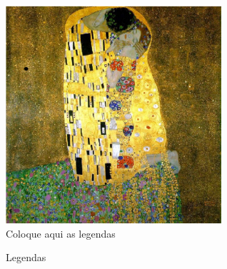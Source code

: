 \begin{figure}[hbtp]
\begin{center}
\includegraphics[width=8cm]{klint.pdf}
\caption{Coloque aqui as legendas}
\label{fig}
\end{center}
\end{figure}
\vspace{0.5cm}

\begin{figure}[htbp]
\begin{center}
\caption{Legendas}
\label{fig_rotacao}
\end{center}
\end{figure}



